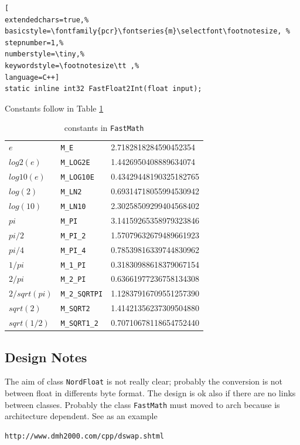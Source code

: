 \begin{lstlisting}[
extendedchars=true,%
basicstyle=\fontfamily{pcr}\fontseries{m}\selectfont\footnotesize, %
stepnumber=1,%
numberstyle=\tiny,%
keywordstyle=\footnotesize\tt ,%
language=C++]
static inline int32 FastFloat2Int(float input);
\end{lstlisting}

Constants follow in Table \ref{t:math:constants}

\begin{table}[!h]
 \begin{center}
  \begin{tabular}{lll}
    $e$ & \texttt{M\_E} & 2.7182818284590452354 \\
    $log2(e)$ & \texttt{M\_LOG2E} & 1.4426950408889634074 \\
    $log10(e)$ & \texttt{M\_LOG10E} & 0.43429448190325182765 \\
    $log(2)$ & \texttt{M\_LN2} & 0.69314718055994530942 \\
    $log(10)$ & \texttt{M\_LN10} & 2.30258509299404568402 \\
    $pi$ & \texttt{M\_PI} & 3.14159265358979323846 \\
    $pi/2$ & \texttt{M\_PI\_2} & 1.57079632679489661923 \\
    $pi/4$ & \texttt{M\_PI\_4} & 0.78539816339744830962 \\
    $1/pi$ & \texttt{M\_1\_PI} & 0.31830988618379067154 \\
    $2/pi$ & \texttt{M\_2\_PI} & 0.63661977236758134308 \\
    $2/sqrt(pi)$ & \texttt{M\_2\_SQRTPI} & 1.12837916709551257390 \\
    $sqrt(2)$ & \texttt{M\_SQRT2} & 1.41421356237309504880 \\
    $sqrt(1/2)$ & \texttt{M\_SQRT1\_2} & 0.70710678118654752440 \\
   \end{tabular}
   \end{center}
  \caption{constants in \texttt{FastMath}}
 \label{t:math:constants}
\end{table}



\subsection{Design Notes}
The aim of class \texttt{NordFloat} is not really clear; probably the conversion is not between float in differents byte format. The design is ok also if there are no links between classes. Probably the class \texttt{FastMath} must moved to arch because is architecture dependent. See as an example
\begin{verbatim}
http://www.dmh2000.com/cpp/dswap.shtml
\end{verbatim}



